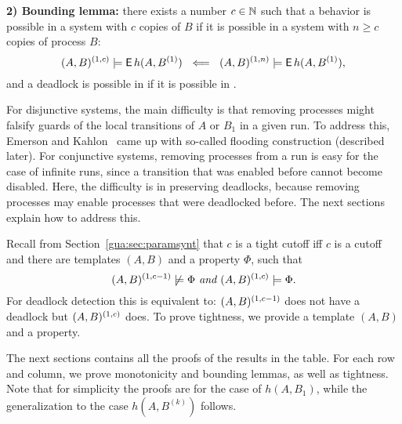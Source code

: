 \smallskip
\noindent
{\bf 2) Bounding lemma:} there exists a number $c \in \mathbb{N}$ such that
a behavior is possible in a system with $c$ copies of $B$ if it is possible in a system with
$n \geq c$ copies of process $B$:
\[
(A,B)^{(1, c)} \models \operatorname{\mathsf{E}} h(A,B^{(1)})
~\impliedby~
(A,B)^{(1, n)} \models \operatorname{\mathsf{E}} h(A,B^{(1)})
,
\]
and a deadlock is possible in \cutoffsys if it is possible in \largesys.

For disjunctive systems,
the main difficulty is that removing processes
might falsify guards of the local transitions of $A$ or $B_1$ in a given run.
To address this,
Emerson and Kahlon~\cite{Emerson00} came up with so-called flooding construction (described later).
For conjunctive systems,
removing processes from a run is easy for the case of infinite runs,
since a transition that was enabled before cannot become disabled.
Here, the difficulty is in preserving deadlocks,
because removing processes may enable processes that were deadlocked before.
The next sections explain how to address this.

Recall from Section~\ref{gua:sec:paramsynt} that
$c$ is a tight cutoff iff $c$ is a cutoff and there are templates $(A,B)$ and a property $\Phi$,
such that
$$(A,B)^{(1,c-1)} \not\models \Phi \textit{ and } (A,B)^{(1,c)} \models \Phi.$$
For deadlock detection this is equivalent to:
$(A,B)^{(1,c-1)}$ does not have a deadlock but $(A,B)^{(1,c)}$ does.
To prove tightness, we provide a template $(A,B)$ and a property.

The next sections contains all the proofs of the results in the table.
For each row and column, we prove monotonicity and bounding lemmas,
as well as tightness.
Note that for simplicity the proofs are for the case of $h(A,B_1)$,
while the generalization to the case $h(A,B^{(k)})$ follows.
